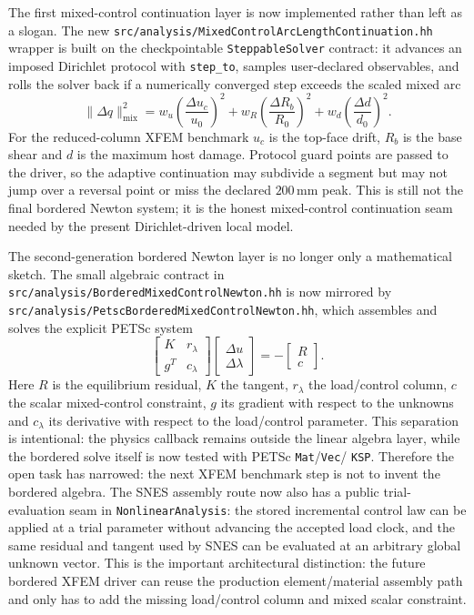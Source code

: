 The first mixed-control continuation layer is now implemented rather than left
as a slogan.  The new
\texttt{src/analysis/MixedControlArcLengthContinuation.hh} wrapper is built on
the checkpointable \texttt{SteppableSolver} contract: it advances an imposed
Dirichlet protocol with \texttt{step\_to}, samples user-declared observables,
and rolls the solver back if a numerically converged step exceeds the scaled
mixed arc
\[
  \|\Delta q\|_{\mathrm{mix}}^2 =
  w_u\left(\frac{\Delta u_c}{u_0}\right)^2+
  w_R\left(\frac{\Delta R_b}{R_0}\right)^2+
  w_d\left(\frac{\Delta d}{d_0}\right)^2 .
\]
For the reduced-column XFEM benchmark \(u_c\) is the top-face drift, \(R_b\)
is the base shear and \(d\) is the maximum host damage.  Protocol guard points
are passed to the driver, so the adaptive continuation may subdivide a segment
but may not jump over a reversal point or miss the declared \(200\,\mathrm{mm}\)
peak.  This is still not the final bordered Newton system; it is the honest
mixed-control continuation seam needed by the present Dirichlet-driven local
model.

The second-generation bordered Newton layer is no longer only a mathematical
sketch.  The small algebraic contract in
\texttt{src/analysis/BorderedMixedControlNewton.hh} is now mirrored by
\texttt{src/analysis/PetscBorderedMixedControlNewton.hh}, which assembles and
solves the explicit PETSc system
\begin{equation}
  \begin{bmatrix}
    K & r_{\lambda}\\
    g^{T} & c_{\lambda}
  \end{bmatrix}
  \begin{bmatrix}
    \Delta u\\
    \Delta \lambda
  \end{bmatrix}
  =
  -
  \begin{bmatrix}
    R\\
    c
  \end{bmatrix}.
\end{equation}
Here \(R\) is the equilibrium residual, \(K\) the tangent, \(r_\lambda\)
the load/control column, \(c\) the scalar mixed-control constraint, \(g\) its
gradient with respect to the unknowns and \(c_\lambda\) its derivative with
respect to the load/control parameter.  This separation is intentional:
the physics callback remains outside the linear algebra layer, while the
bordered solve itself is now tested with PETSc \texttt{Mat}/\texttt{Vec}/
\texttt{KSP}.  Therefore the open task has narrowed: the next XFEM benchmark
step is not to invent the bordered algebra.  The SNES assembly route now also
has a public trial-evaluation seam in \texttt{NonlinearAnalysis}: the stored
incremental control law can be applied at a trial parameter without advancing
the accepted load clock, and the same residual and tangent used by SNES can be
evaluated at an arbitrary global unknown vector.  This is the important
architectural distinction: the future bordered XFEM driver can reuse the
production element/material assembly path and only has to add the missing
load/control column and mixed scalar constraint.

